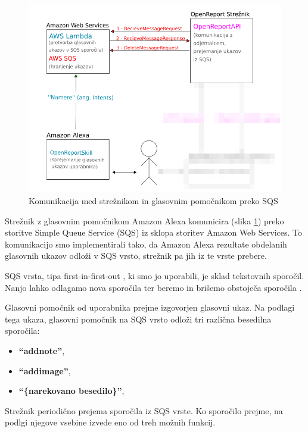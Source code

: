 \documentclass[a4paper, 12pt]{book}
\begin{document}
\begin{figure}[H]
\begin{center}
\includegraphics[width=13cm]{plan_sqs_server_alexa}
\end{center}
\caption{Komunikacija med strežnikom in glasovnim pomočnikom preko SQS}
\label{plan_sqs_server_alexa}
\end{figure}


Strežnik z glasovnim pomočnikom Amazon Alexa komunicira (slika \ref{plan_sqs_server_alexa}) preko storitve Simple Queue Service (SQS) iz sklopa storitev Amazon Web Services.
To komunikacijo smo implementirali tako, da Amazon Alexa rezultate obdelanih glasovnih ukazov odloži v SQS vrsto, strežnik pa jih iz te vrste prebere.

SQS vrsta, tipa first-in-first-out \cite{sqsfifo}, ki smo jo uporabili, je sklad tekstovnih sporočil.
Nanjo lahko odlagamo nova sporočila ter beremo in brišemo obstoječa sporočila .


Glasovni pomočnik od uporabnika prejme izgovorjen glasovni ukaz.
Na podlagi tega ukaza, glasovni pomočnik na SQS vrsto odloži tri različna besedilna sporočila:
\begin{itemize}
	\item \textbf{\enquote{addnote}},
	\item \textbf{\enquote{addimage}},
	\item \textbf{\enquote{\{narekovano besedilo\}}},
\end{itemize}

Strežnik periodično prejema sporočila iz SQS vrste.
Ko sporočilo prejme, na podlgi njegove vsebine izvede eno od treh možnih funkcij.
\end{document}
